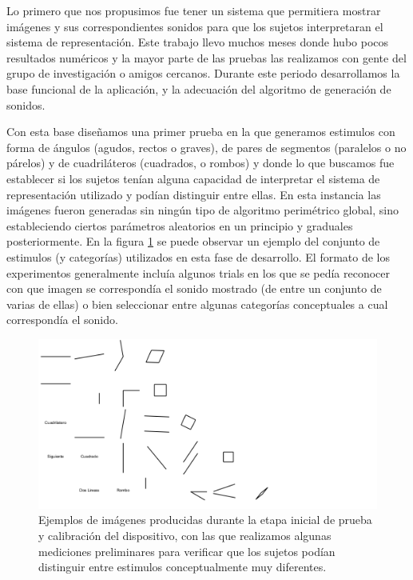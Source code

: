 \documentclass{article}
\begin{document}
    Lo primero que nos propusimos fue tener un sistema que permitiera mostrar imágenes y sus correspondientes sonidos para que los sujetos interpretaran el sistema de representación. Este trabajo llevo muchos meses donde hubo pocos resultados numéricos y la mayor parte de las pruebas las realizamos con gente del grupo de investigación o amigos cercanos. Durante este periodo desarrollamos la base funcional de la aplicación, y la adecuación del algoritmo de generación de sonidos. 
    
    Con esta base diseñamos una primer prueba en la que generamos estimulos con forma de ángulos (agudos, rectos o graves), de pares de segmentos (paralelos o no párelos) y de cuadriláteros (cuadrados, o rombos) y donde lo que buscamos fue establecer si los sujetos tenían alguna capacidad de interpretar el sistema de representación utilizado y podían distinguir entre ellas. En esta instancia las imágenes fueron generadas sin ningún tipo de algoritmo perimétrico global, sino estableciendo ciertos parámetros aleatorios en un principio y graduales posteriormente. En la figura \ref{fig:ImagenesDesarrollo1} se puede observar un ejemplo del conjunto de estimulos (y categorías) utilizados en esta fase de desarrollo. El formato de los experimentos generalmente incluía algunos trials en los que se pedía reconocer con que imagen se correspondía el sonido mostrado (de entre un conjunto de varias de ellas) o bien seleccionar entre algunas categorías conceptuales a cual correspondía el sonido. 
    
    \begin{figure}
        \center
        \includegraphics[width=\textwidth]{Imagenes/ImagenesDesarrollo1.png}
        \caption{Ejemplos de imágenes producidas durante la etapa inicial de prueba y calibración del dispositivo, con las que realizamos algunas mediciones preliminares para verificar que los sujetos podían distinguir entre estimulos conceptualmente muy diferentes.}
        \label{fig:ImagenesDesarrollo1}
    \end{figure}  
    
\end{document}
